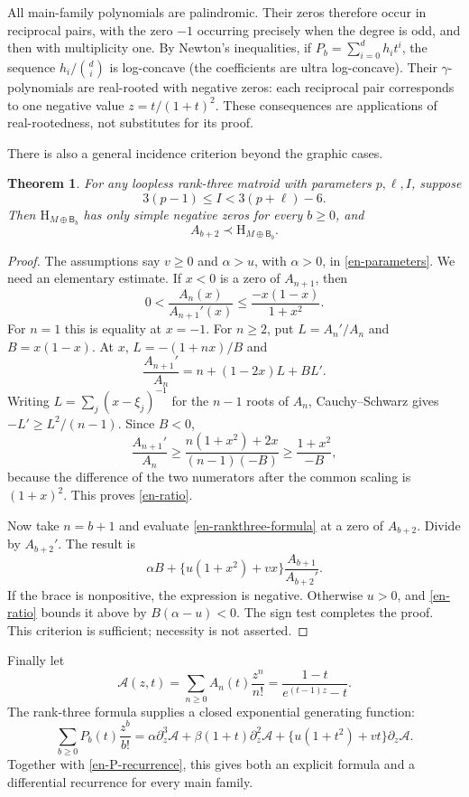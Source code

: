 \documentclass[12pt]{amsart}
\newtheorem{thm}{Theorem}[section]
\theoremstyle{definition}
\theoremstyle{remark}
\numberwithin{equation}{section}
\newcommand{\HCh}{\mathrm{H}}
\newcommand{\Bmat}{\mathsf{B}}
\begin{document}
All main-family polynomials are palindromic. Their zeros therefore occur in reciprocal pairs, with the zero $-1$ occurring precisely when the degree is odd, and then with multiplicity one. By Newton's inequalities, if $P_b=\sum_{i=0}^d h_i t^i$, the sequence $h_i/\binom di$ is log-concave (the coefficients are ultra log-concave). Their $\gamma$-polynomials are real-rooted with negative zeros: each reciprocal pair corresponds to one negative value $z=t/(1+t)^2$. These consequences are applications of real-rootedness, not substitutes for its proof.

There is also a general incidence criterion beyond the graphic cases.
\begin{samepage}
\begin{thm}\label{en-incidence-criterion}
For any loopless rank-three matroid with parameters $p,\ell,I$, suppose
\[
 3(p-1)\leq I<3(p+\ell)-6.
\]
Then $\HCh_{M\oplus\Bmat_b}$ has only simple negative zeros for every $b\geq0$, and
\[
 A_{b+2}\prec\HCh_{M\oplus\Bmat_b}.
\]
\end{thm}
\end{samepage}
\begin{proof}
The assumptions say $v\geq0$ and $\alpha>u$, with $\alpha>0$, in \eqref{en-parameters}. We need an elementary estimate. If $x<0$ is a zero of $A_{n+1}$, then
\begin{equation}\label{en-ratio}
 0<\frac{A_n(x)}{A_{n+1}'(x)}\leq\frac{-x(1-x)}{1+x^2}.
\end{equation}
For $n=1$ this is equality at $x=-1$. For $n\geq2$, put $L=A_n'/A_n$ and $B=x(1-x)$. At $x$, $L=-(1+nx)/B$ and
\[
 \frac{A_{n+1}'}{A_n}=n+(1-2x)L+BL'.
\]
Writing $L=\sum_j(x-\xi_j)^{-1}$ for the $n-1$ roots of $A_n$, Cauchy--Schwarz gives $-L'\geq L^2/(n-1)$. Since $B<0$,
\[
 \frac{A_{n+1}'}{A_n}\geq
 \frac{n(1+x^2)+2x}{(n-1)(-B)}
 \geq\frac{1+x^2}{-B},
\]
because the difference of the two numerators after the common scaling is $(1+x)^2$. This proves \eqref{en-ratio}.

Now take $n=b+1$ and evaluate \eqref{en-rankthree-formula} at a zero of $A_{b+2}$. Divide by $A_{b+2}'$. The result is
\[
 \alpha B+\{u(1+x^2)+vx\}\frac{A_{b+1}}{A_{b+2}'}.
\]
If the brace is nonpositive, the expression is negative. Otherwise $u>0$, and \eqref{en-ratio} bounds it above by $B(\alpha-u)<0$. The sign test completes the proof. This criterion is sufficient; necessity is not asserted.
\end{proof}

Finally let
\[
 \mathcal A(z,t)=\sum_{n\geq0}A_n(t)\frac{z^n}{n!}
 =\frac{1-t}{e^{(t-1)z}-t}.
\]
The rank-three formula supplies a closed exponential generating function:
\[
 \sum_{b\geq0}P_b(t)\frac{z^b}{b!}
 =\alpha\partial_z^3\mathcal A+\beta(1+t)\partial_z^2\mathcal A
       +\{u(1+t^2)+vt\}\partial_z\mathcal A.
\]
Together with \eqref{en-P-recurrence}, this gives both an explicit formula and a differential recurrence for every main family.
\end{document}
